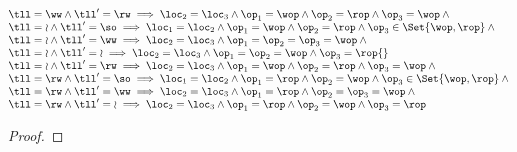 \begin{lem}
\[\begin{array}{@{}l@{}}
            \tll = \ww \land \tll' = \rw \implies \loc_{2} = \loc_{3} \land \op_{1} = \wop \land \op_{2} = \rop \land \op_{3} = \wop \land {} \\
            \tll = \wr \land \tll' = \so \implies \loc_{1} = \loc_{2} \land \op_{1} = \wop \land \op_{2} = \rop \land \op_{3} \in \Set{\wop, \rop} \land {} \\
            \tll = \wr \land \tll' = \ww \implies \loc_{2} = \loc_{3} \land \op_{1} = \op_{2} = \op_{3} = \wop \land {} \\
            \tll = \wr \land \tll' = \wr \implies \loc_{2} = \loc_{3} \land \op_{1} = \op_{2} = \wop \land \op_{3} = \rop {} \\
            \tll = \wr \land \tll' = \rw \implies \loc_{2} = \loc_{3} \land \op_{1} = \wop \land \op_{2} = \rop \land \op_{3} = \wop \land {} \\
            \tll = \rw \land \tll' = \so \implies \loc_{1} = \loc_{2} \land \op_{1} = \rop \land \op_{2} = \wop \land \op_{3} \in \Set{\wop, \rop} \land {} \\
            \tll = \rw \land \tll' = \ww \implies \loc_{2} = \loc_{3} \land \op_{1} = \rop \land \op_{2} = \op_{3} = \wop \land {} \\
            \tll = \rw \land \tll' = \wr \implies \loc_{2} = \loc_{3} \land \op_{1} = \rop \land \op_{2} = \wop \land \op_{3} = \rop 
        \end{array}
    \]
\end{lem}
\begin{proof}

\end{proof}



     
